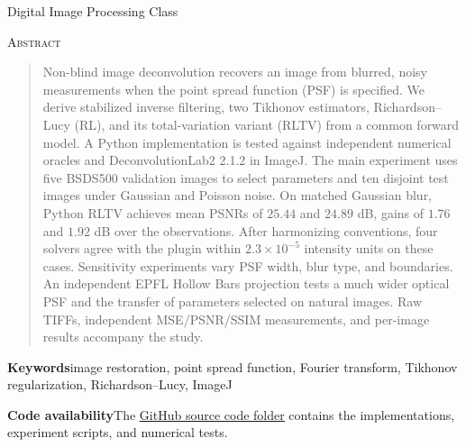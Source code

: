 \documentclass[10pt,a4paper,onecolumn]{article}
\begin{document}
\hypersetup{pageanchor=false}

\hypersetup{pageanchor=true}

\begin{flushleft}
{\LARGE\scshape \papertitle\par}
\vspace{.68em}
{\normalsize\bfseries \paperauthors\par}
\vspace{.25em}
{\small \institution\par
Digital Image Processing \enspace\textbar\enspace Class \classcode\par}
\end{flushleft}

\begin{center}\large\scshape Abstract\end{center}
\begin{quote}
Non-blind image deconvolution recovers an image from blurred, noisy measurements when the point spread function (PSF) is specified. We derive stabilized inverse filtering, two Tikhonov estimators, Richardson--Lucy (RL), and its total-variation variant (RLTV) from a common forward model. A Python implementation is tested against independent numerical oracles and DeconvolutionLab2 2.1.2 in ImageJ. The main experiment uses five BSDS500 validation images to select parameters and ten disjoint test images under Gaussian and Poisson noise. On matched Gaussian blur, Python RLTV achieves mean PSNRs of \(25.44\) and \(24.89\) dB, gains of \(1.76\) and \(1.92\) dB over the observations. After harmonizing conventions, four solvers agree with the plugin within \(2.3\times10^{-5}\) intensity units on these cases. Sensitivity experiments vary PSF width, blur type, and boundaries. An independent EPFL Hollow Bars projection tests a much wider optical PSF and the transfer of parameters selected on natural images. Raw TIFFs, independent MSE/PSNR/SSIM measurements, and per-image results accompany the study.
\end{quote}
\textbf{Keywords}\quad image restoration, point spread function, Fourier transform, Tikhonov regularization, Richardson--Lucy, ImageJ

\textbf{Code availability}\quad The \href{https://github.com/Hieuvu4438/image-deconvolution-btl/tree/main/code}{\textcolor{listingkeyword}{\underline{GitHub source code folder}}} contains the implementations, experiment scripts, and numerical tests.








\FloatBarrier

\clearpage
\appendix


\end{document}
